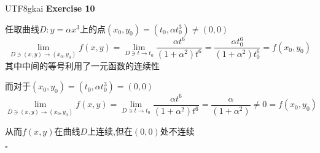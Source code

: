 \documentclass{article}
\newenvironment{exercise}[1]{%
{\textbf{Exercise #1} \\ 
    }
}{
  \hfill $\square$ 
  \par\bigskip 
}
\begin{document}
\begin{CJK}{UTF8}{gkai}
\begin{exercise}{10}
    任取曲线$D: y = \alpha x^3$上的点$(x_0,y_0) = (t_0,\alpha t_0^3) \neq (0,0)$
    \[\lim_{{D \owns (x,y)\to (x_0,y_0)}} f(x,y) = \lim_{{D \owns t\to t_0}} \frac{\alpha t^6}{(1 + \alpha^2)t^6} = \frac{\alpha t_0^6}{(1 + \alpha^2)t_0^6} = f(x_0,y_0)\]
    其中中间的等号利用了一元函数的连续性

    而对于$(x_0,y_0) = (t_0,\alpha t_0^3) = (0,0)$
    \[\lim_{{D \owns (x,y)\to (x_0,y_0)}} f(x,y) = \lim_{{D \owns t\to t_0} } \frac{\alpha t^6}{(1 + \alpha^2)t^6} = \frac{\alpha}{(1 + \alpha^2)} \neq 0 = f(x_0,y_0)\]    

    从而$f(x,y)$在曲线$D$上连续,但在$(0,0)$处不连续
    
\end{exercise}

\end{CJK}
\end{document}

